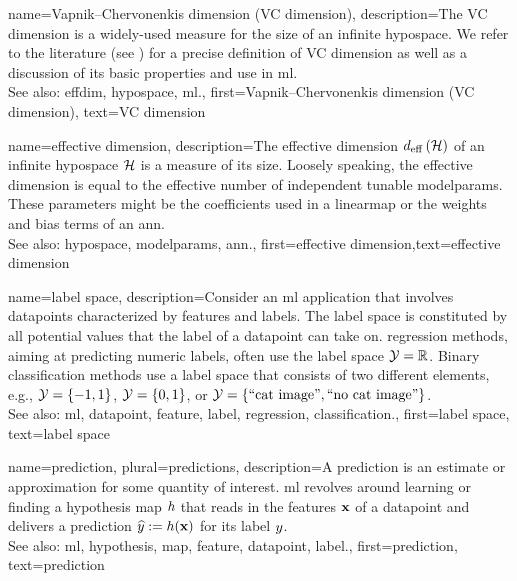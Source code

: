 {name={Vapnik–Chervonenkis dimension (VC dimension)},
	description={The VC dimension 
	is a widely-used measure for the size of an infinite \gls{hypospace}. We refer to 
	the literature (see \cite{ShalevMLBook}) for a precise definition of VC dimension 
	as well as a discussion of its basic properties and use in \gls{ml}.
					\\ 
		See also: \gls{effdim}, \gls{hypospace}, \gls{ml}.},
	first={Vapnik–Chervonenkis dimension (VC dimension)},
	text={VC dimension}  
}

{name={effective dimension},
	description={The effective dimension $d_{\rm eff} \left( \mathcal{H} \right)$ of 
		an infinite \gls{hypospace} $\mathcal{H}$ is a measure of its size. Loosely speaking, the 
		effective dimension is equal to the effective number of independent tunable \gls{modelparams}. 
		These \glspl{parameter} might be the coefficients used in a \gls{linearmap} or the 
		\gls{weights} and \gls{bias} terms of an \gls{ann}.
					\\ 
		See also: \gls{hypospace}, \gls{modelparams}, \gls{ann}.},
	first={effective dimension},text={effective dimension}  
}

{name={label space},
	description={Consider an \gls{ml} application that involves \glspl{datapoint} characterized by \glspl{feature} 
		and \glspl{label}. The \gls{label} space is constituted by all potential values that the \gls{label} 
		of a \gls{datapoint} can take on. \Gls{regression} methods, aiming at predicting numeric \glspl{label}, often
		 use the \gls{label} space $\mathcal{Y} = \mathbb{R}$. Binary \gls{classification} methods use a \gls{label} space 
 		that consists of two different elements, e.g., $\mathcal{Y} =\{-1,1\}$, $\mathcal{Y}=\{0,1\}$, 
		or $\mathcal{Y} = \{ \mbox{``cat image''}, \mbox{``no cat image''} \}$.
					\\ 
		See also: \gls{ml}, \gls{datapoint}, \gls{feature}, \gls{label}, \gls{regression}, \gls{classification}.}, 
	first={label space},
	text={label space}  
}

{name={prediction}, plural={predictions},
	description={A prediction is an estimate or approximation for some 
		quantity of interest. \Gls{ml} revolves around learning or finding a \gls{hypothesis} \gls{map} $h$ 
		that reads in the \glspl{feature} ${\bf x}$ of a \gls{datapoint} and delivers a prediction 
		$\widehat{y} := h({\bf x})$ for its \gls{label} $y$.
					\\ 
		See also: \gls{ml}, \gls{hypothesis}, \gls{map}, \gls{feature}, \gls{datapoint}, \gls{label}.},
	first={prediction},
	text={prediction}  
}



